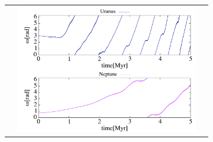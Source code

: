\documentclass[11pt,a4paper,oneside,onecolumn]{jarticle}
\begin{document}
\begin{figure}[H]
\begin{tabular}{ccc}
\begin{minipage}[t]{0.1\hsize}
\end{minipage} &
\begin{minipage}[t]{0.45\hsize}
\centering
\includegraphics[width=8cm]{./image/Move500kyr_smallomega_5Myr_URANEP.pdf}
\end{minipage}
%
\end{tabular}
\caption{\label{}}
\end{figure}
\end{document}
